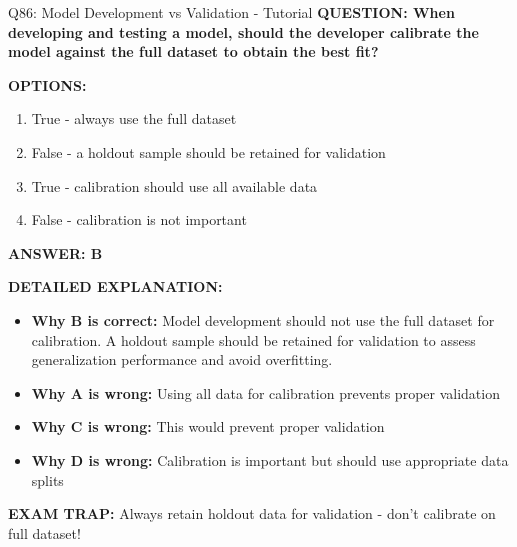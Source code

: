 \documentclass[8pt]{beamer}
\begin{document}
	\begin{frame}{Q86: Model Development vs Validation - Tutorial}
		\fontsize{6.5}{7.5}\selectfont
		\textbf{QUESTION: When developing and testing a model, should the developer calibrate the model against the full dataset to obtain the best fit?}
		
		\vspace{0.1cm}
		\textbf{OPTIONS:}
		\begin{enumerate}
			\item True - always use the full dataset
			\item False - a holdout sample should be retained for validation
			\item True - calibration should use all available data
			\item False - calibration is not important
		\end{enumerate}
		
		\vspace{0.1cm}
		\textcolor{myblue}{\textbf{ANSWER: B}}
		
		\vspace{0.1cm}
		\textbf{DETAILED EXPLANATION:}
		\begin{itemize}
			\item \textbf{Why B is correct:} Model development should not use the full dataset for calibration. A holdout sample should be retained for validation to assess generalization performance and avoid overfitting.
			\item \textbf{Why A is wrong:} Using all data for calibration prevents proper validation
			\item \textbf{Why C is wrong:} This would prevent proper validation
			\item \textbf{Why D is wrong:} Calibration is important but should use appropriate data splits
		\end{itemize}
		
		\textcolor{myred}{\textbf{EXAM TRAP:}} Always retain \textcolor{myblue}{holdout data for validation} - don't calibrate on full dataset!
	\end{frame}
	
\end{document}
